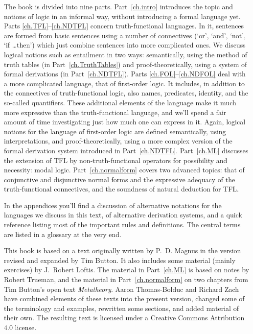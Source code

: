 The book is divided into nine parts. Part~\ref{ch.intro} introduces the topic and notions of logic in an informal way, without introducing a formal language yet.  Parts \ref{ch.TFL}--\ref{ch.NDTFL} concern truth-functional languages. In it, sentences are formed from basic sentences using a number of connectives (`or', `and', `not', `if \dots then') which just combine sentences into more complicated ones.  We discuss logical notions such as entailment in two ways: semantically, using the method of truth tables (in Part~\ref{ch.TruthTables}) and proof-theoretically, using a system of formal derivations (in Part~\ref{ch.NDTFL}).  Parts \ref{ch.FOL}--\ref{ch.NDFOL} deal with a more complicated language, that of first-order logic. It includes, in addition to the connectives of truth-functional logic, also names, predicates, identity, and the so-called quantifiers. These additional elements of the language make it much more expressive than the truth-functional language, and we'll spend a fair amount of time investigating just how much one can express in it.  Again, logical notions for the language of first-order logic are defined semantically, using interpretations, and proof-theoretically, using a more complex version of the formal derivation system introduced in Part~\ref{ch.NDTFL}.  Part~\ref{ch.ML} discusses the extension of TFL by non-truth-functional operators for possibility and necessity: modal logic. Part~\ref{ch.normalform} covers two advanced topics: that of conjunctive and disjunctive normal forms and the expressive adequacy of the truth-functional connectives, and the soundness of natural deduction for TFL.

In the appendices you'll find a discussion of alternative notations for the languages we discuss in this text, of alternative derivation systems, and a quick reference listing most of the important rules and definitions. The central terms are listed in a glossary at the very end.

This book is based on a text originally written by P.~D. Magnus in the version revised and expanded by Tim Button. It also includes some material (mainly exercises) by J.~Robert Loftis. The material in Part~\ref{ch.ML} is based on notes by Robert Trueman, and the material in Part~\ref{ch.normalform} on two chapters from Tim Button's open text \emph{Metatheory}. Aaron Thomas-Bolduc and Richard Zach have combined elements of these texts into the present version, changed some of the terminology and examples, rewritten some sections, and added material of their own.  The resulting text is licensed under a Creative Commons Attribution 4.0 license.
